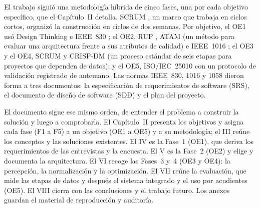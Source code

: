 El trabajo siguió una metodología híbrida de cinco fases, una por cada objetivo específico, que el Capítulo~II detalla. SCRUM \citep{schwaber_scrum_2020}, un marco que trabaja en ciclos cortos, organizó la construcción en ciclos de dos semanas. Por objetivo, el OE1 usó Design Thinking \citep{brown_design_2008} e IEEE~830 \citep{ieee_830_1998}; el OE2, RUP \citep{kruchten_rup_2003}, ATAM \citep{bass_software_2021} (un método para evaluar una arquitectura frente a sus atributos de calidad) e IEEE~1016 \citep{ieee_1016_2009}; el OE3 y el OE4, SCRUM y CRISP-DM \citep{chapman_crisp-dm_2000} (un proceso estándar de seis etapas para proyectos que dependen de datos); y el OE5, ISO/IEC~25010 con un protocolo de validación registrado de antemano. Las normas IEEE~830, 1016 y 1058 \citep{ieee_1058_1998} dieron forma a tres documentos: la especificación de requerimientos de software (SRS), el documento de diseño de software (SDD) y el plan del proyecto.\par

El documento sigue ese mismo orden, de entender el problema a construir la solución y luego a comprobarla.
El Capítulo~II presenta los objetivos y asigna cada fase (F1 a F5) a un objetivo (OE1 a OE5) y a su metodología; el III reúne los conceptos y las soluciones existentes. El IV es la Fase~1 (OE1), que deriva los requerimientos de las entrevistas y la encuesta.
El V es la Fase~2 (OE2) y elige y documenta la arquitectura. El VI recoge las Fases~3
y~4 (OE3 y OE4): la percepción, la normalización y la optimización. El VII reúne la evaluación, que mide las etapas de datos y después el sistema integrado y el uso por acudientes (OE5). El VIII cierra con las conclusiones y el trabajo
futuro. Los anexos guardan el material de reproducción y auditoría.\par
